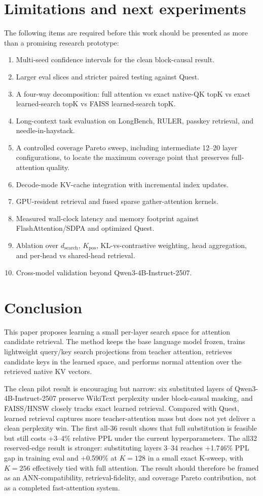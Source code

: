 \documentclass[10pt]{article}
\begin{document}
\section{Limitations and next experiments}
The following items are required before this work should be presented as more
than a promising research prototype:
\begin{enumerate}
    \item Multi-seed confidence intervals for the clean block-causal result.
    \item Larger eval slices and stricter paired testing against Quest.
    \item A four-way decomposition: full attention vs exact native-QK topK vs
    exact learned-search topK vs FAISS learned-search topK.
    \item Long-context task evaluation on LongBench, RULER, passkey retrieval,
    and needle-in-haystack.
    \item A controlled coverage Pareto sweep, including intermediate 12--20
    layer configurations, to locate the maximum coverage point that preserves
    full-attention quality.
    \item Decode-mode KV-cache integration with incremental index updates.
    \item GPU-resident retrieval and fused sparse gather-attention kernels.
    \item Measured wall-clock latency and memory footprint against
    FlashAttention/SDPA and optimized Quest.
    \item Ablation over $d_{\mathrm{search}}$, $K_{\mathrm{pos}}$,
    KL-vs-contrastive weighting, head aggregation, and per-head vs shared-head
    retrieval.
    \item Cross-model validation beyond Qwen3-4B-Instruct-2507.
\end{enumerate}

\section{Conclusion}
This paper proposes learning a small per-layer search space for attention
candidate retrieval. The method keeps the base language model frozen, trains
lightweight query/key search projections from teacher attention, retrieves
candidate keys in the learned space, and performs normal attention over the
retrieved native KV vectors.

The clean pilot result is encouraging but narrow: six substituted layers of
Qwen3-4B-Instruct-2507 preserve WikiText perplexity under block-causal masking,
and FAISS/HNSW closely tracks exact learned retrieval. Compared with Quest,
learned retrieval captures more teacher-attention mass but does not yet deliver
a clean perplexity win. The first all-36 result shows that full substitution is
feasible but still costs +3--4\% relative PPL under the current hyperparameters.
The all32 reserved-edge result is stronger: substituting layers 3--34 reaches
+1.746\% PPL gap in training eval and +0.590\% at $K=128$ in a small exact
K-sweep, with $K=256$ effectively tied with full attention. The result should
therefore be framed as an ANN-compatibility, retrieval-fidelity, and coverage
Pareto contribution, not as a completed fast-attention system.
\end{document}
